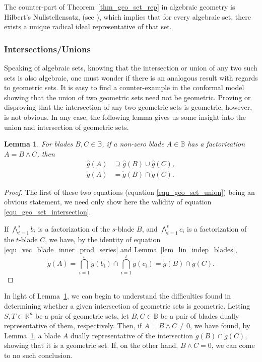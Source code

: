 \documentclass{birkjour}
\newtheorem{lem}[thm]{Lemma}
\theoremstyle{definition}
\theoremstyle{remark}
\numberwithin{equation}{section}
\newcommand{\R}{\mathbb{R}}
\newcommand{\B}{\mathbb{B}}
\newcommand{\gd}{\dot{g}}
\newcommand{\gh}{\hat{g}}
\begin{document}
The counter-part of Theorem~\ref{thm_geo_set_rep} in algebraic geometry is Hilbert's Nullstellensatz, (see \cite{}),
which implies that for every algebraic set, there exists a unique radical ideal representative of that set.

\subsubsection{Intersections/Unions}

Speaking of algebraic sets, knowing that the intersection or union of any two such sets is also algebraic,
one must wonder if there is an analogous result with regards to geometric sets.  It is easy to find a counter-example
in the conformal model showing that the union of two geometric sets need not be geometric.
Proving or disproving that the intersection of any two geometric sets is geometric, however, is not obvious.
In any case, the following lemma gives us some insight into the union and intersection of geometric sets.

\begin{lem}\label{lem_union_intersect}
For blades $B,C\in\B$, if a non-zero blade $A\in\B$ has a factorization $A=B\wedge C$, then
\begin{align}
\gh(A) &\supseteq \gh(B)\cup\gh(C),\label{equ_geo_set_union} \\
\gd(A) &= \gd(B)\cap\gd(C).\label{equ_geo_set_intersection}
\end{align}
\end{lem}
\begin{proof}
The first of these two equations (equation \eqref{equ_geo_set_union}) being an obvious statement,
we need only show here the validity of equation \eqref{equ_geo_set_intersection}.

If $\bigwedge_{i=1}^s b_i$ is a factorization of the $s$-blade $B$, and
$\bigwedge_{i=1}^t c_i$ is a factorization of the $t$-blade $C$, we have,
by the identity of equation \eqref{equ_vec_blade_inner_prod_series} and Lemma~\ref{lem_lin_indep_blades},
\begin{equation}
\gd(A) = \bigcap_{i=1}^s\gd(b_i)\cap\bigcap_{i=1}^t\gd(c_i) = \gd(B)\cap\gd(C).
\end{equation}
\end{proof}

In light of Lemma~\ref{lem_union_intersect}, we can begin to understand the difficulties found in determining
whether a given intersection of geometric sets is geometric.  Letting $S,T\subset\R^n$ be
a pair of geometric sets, let $B,C\in\B$ be a pair of blades dually representative of them, respectively.
Then, if $A=B\wedge C\neq 0$, we have found, by Lemma~\ref{lem_union_intersect}, a blade $A$ dually
representative of the intersection $\gd(B)\cap\gd(C)$, showing that it is a geometric set.
If, on the other hand, $B\wedge C=0$, we can come to no such conclusion.
\end{document}
